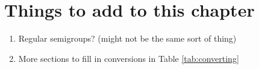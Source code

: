
\section{Things to add to this chapter}
\begin{enumerate}
\item Regular semigroups? (might not be the same sort of thing)
\item More sections to fill in conversions in Table \ref{tab:converting}
\end{enumerate}
